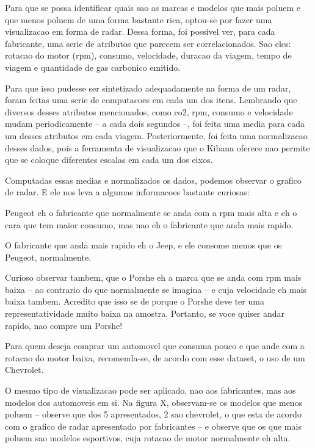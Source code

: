\documentclass[10pt, conference]{IEEEtran}
\begin{document}
Para que se possa identificar quais sao as marcas e modelos que mais poluem e que menos poluem
de uma forma bastante rica, optou-se por fazer uma visualizacao em forma de radar. Dessa forma,
foi possivel ver, para cada fabricante, uma serie de atributos que parecem ser correlacionados.
Sao eles: rotacao do motor (rpm), consumo, velocidade, duracao da viagem, tempo de viagem e 
quantidade de gas carbonico emitido. 

Para que isso pudesse ser sintetizado adequadamente na forma de um radar, foram feitas uma serie
de computacoes em cada um dos itens. Lembrando que diversos desses atributos mencionados, como
co2, rpm, consumo e velocidade mudam periodicamente -- a cada dois segundos --, foi feita uma media
para cada um desses atributos em cada viagem. Posteriormente, foi feita uma normalizacao desses dados,
pois a ferramenta de visualizacao que o Kibana oferece nao permite que se coloque diferentes escalas
em cada um dos eixos.

Computadas essas medias e normalizados os dados, podemos observar o grafico de radar. E ele nos leva
a algumas informacoes bastante curiosas:

Peugeot eh o fabricante que normalmente se anda com a rpm mais alta e eh o cara que tem maior consumo, 
mas nao eh o fabricante que anda mais rapido. 

O fabricante que anda mais rapido eh o Jeep, e ele consome menos que os Peugeot, normalmente.

Curioso observar tambem, que o Porshe eh a marca que se anda com rpm mais baixa -- ao contrario do que normalmente
se imagina -- e cuja velocidade eh mais baixa tambem. Acredito que isso se de porque o Porshe deve ter uma
representatividade muito baixa na amostra. Portanto, se voce quiser andar rapido, nao compre um Porshe!

Para quem deseja comprar um automovel que consuma pouco e que ande com a rotacao do motor baixa, recomenda-se,
de acordo com esse dataset, o uso de um Chevrolet.



O mesmo tipo de visualizacao pode ser aplicado, nao aos fabricantes, mas aos modelos dos automoveis em si.
Na figura X, observam-se os modelos que menos poluem -- observe que dos 5 apresentados, 2 sao chevrolet, o
que esta de acordo com o grafico de radar apresentado por fabricantes -- e observe que os que mais poluem
sao modelos esportivos, cuja rotacao de motor normalmente eh alta.
\end{document}
